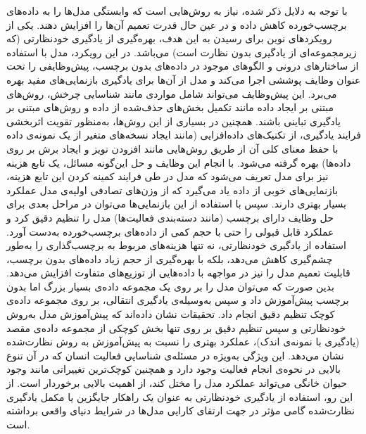 با توجه به دلایل ذکر شده، نیاز به روش‌هایی است که وابستگی مدل‌ها را به داده‌های برچسب‌خورده کاهش داده و در عین حال قدرت تعمیم آن‌ها را افزایش دهند. یکی از رویکردهای نوین برای رسیدن به این هدف، بهره‌گیری از یادگیری خودنظارتی
(که زیرمجموعه‌ای از یادگیری بدون نظارت است)
می‌باشد. در این رویکرد، مدل با استفاده از ساختارهای درونی و الگوهای موجود در داده‌های بدون برچسب، پیش‌وظایفی را تحت عنوان
وظایف پوششی
اجرا می‌کند و مدل از آن‌ها برای یادگیری
بازنمایی‌های
مفید بهره می‌برد. این پیش‌وظایف می‌تواند شامل مواردی مانند شناسایی چرخش\cite{gidaris2018unsupervised}،
روش‌های مبتنی بر ایجاد داده مانند تکمیل بخش‌های حذف‌شده از داده\cite{he2022masked}
و روش‌های مبتنی بر یادگیری تباینی\cite{chen2020simple,grill2020bootstrap,caron2020unsupervised}
باشند. همچنین در بسیاری از این روش‌ها، به‌منظور تقویت اثربخشی فرایند یادگیری، از تکنیک‌های
داده‌افزایی
(مانند ایجاد نسخه‌های متغیر از یک نمونه‌ی داده با حفظ معنای کلی آن از طریق روش‌هایی مانند افزودن نویز و ایجاد برش بر روی داده‌ها) بهره گرفته می‌شود. با انجام این وظایف و حل این‌گونه مسائل، یک تابع هزینه نیز برای مدل تعریف می‌شود که مدل در طی فرایند کمینه کردن این تابع هزینه، بازنمایی‌های خوبی از داده یاد می‌گیرد که از وزن‌های تصادفی اولیه‌ی مدل عملکرد بسیار بهتری دارند.
سپس با استفاده از این بازنمایی‌ها می‌توان در مراحل بعدی برای حل وظایف دارای برچسب (مانند دسته‌بندی فعالیت‌ها) مدل را
تنظیم دقیق
کرد و عملکرد قابل قبولی را حتی با حجم کمی از داده‌های برچسب‌خورده به‌دست آورد\cite{gidaris2018unsupervised}.
استفاده از یادگیری خودنظارتی، نه تنها هزینه‌های مربوط به برچسب‌گذاری را به‌طور چشم‌گیری کاهش می‌دهد، بلکه با بهره‌گیری از حجم زیاد داده‌های بدون برچسب، قابلیت تعمیم مدل را نیز در مواجهه با داده‌هایی از توزیع‌های متفاوت افزایش می‌دهد. بدین صورت که می‌توان مدل را بر روی یک مجموعه داده‌ی بسیار بزرگ اما بدون برچسب پیش‌آموزش داد و سپس به‌وسیله‌ی
یادگیری انتقالی،
بر روی مجموعه داده‌ی کوچک تنظیم دقیق انجام داد. تحقیقات نشان داده‌اند که پیش‌آموزش مدل به‌روش خودنظارتی و سپس تنظیم دقیق بر روی تنها بخش کوچکی از مجموعه داده‌ی مقصد
(یادگیری با نمونه‌ی اندک)،
عملکرد بهتری را نسبت به پیش‌آموزش به روش نظارت‌شده نشان می‌دهد\cite{chen2020big,yuan2024self}.
این ویژگی به‌ویژه در مسئله‌ی شناسایی فعالیت انسان که در آن تنوع بالایی در نحوه‌ی انجام فعالیت وجود دارد و همچنین کوچک‌ترین تغییراتی مانند وجود حیوان خانگی می‌تواند عملکرد مدل را مختل کند، از اهمیت بالایی برخوردار است. از این رو، استفاده از یادگیری خودنظارتی به عنوان یک راهکار جایگزین یا مکمل یادگیری نظارت‌شده گامی مؤثر در جهت ارتقای کارایی مدل‌ها در شرایط دنیای واقعی برداشته است.

